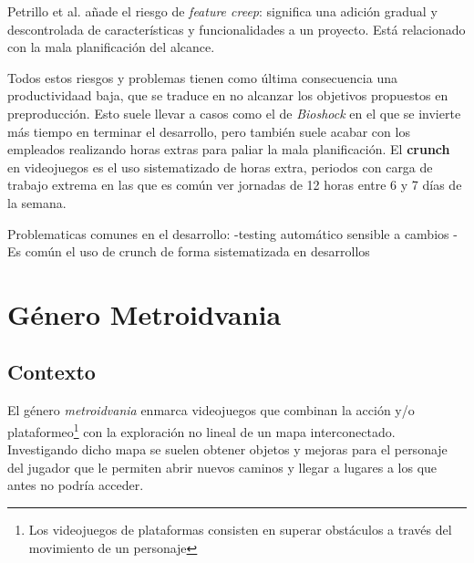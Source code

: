 Petrillo et al.\cite{petrillo} añade el riesgo de \textit{feature creep}: significa una adición gradual y descontrolada de características y funcionalidades a un proyecto. Está relacionado con la mala planificación del alcance.

Todos estos riesgos y problemas tienen como última consecuencia una productividaad baja, que se traduce en no alcanzar los objetivos propuestos en preproducción. Esto suele llevar a casos como el de \textit{Bioshock} en el que se invierte más tiempo en terminar el desarrollo, pero también suele acabar con los empleados realizando horas extras para paliar la mala planificación. El \textbf{crunch} en videojuegos es el uso sistematizado de horas extra, periodos con carga de trabajo extrema en las que es común ver jornadas de 12 horas entre 6 y 7 días de la semana.

Problematicas comunes en el desarrollo:
-testing automático sensible a cambios
- Es común el uso de crunch de forma sistematizada en desarrollos

\section{Género Metroidvania}

\subsection{Contexto}

El género \textit{metroidvania} enmarca videojuegos que combinan la acción y/o plataformeo\footnote{Los videojuegos de plataformas consisten en superar obstáculos a través del movimiento de un personaje} con la exploración no lineal de un mapa interconectado. Investigando dicho mapa se suelen obtener objetos y mejoras para el personaje del jugador que le permiten abrir nuevos caminos y llegar a lugares a los que antes no podría acceder.

